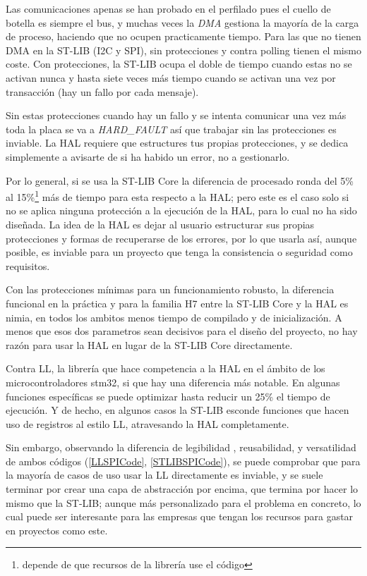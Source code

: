 \documentclass{report}
\begin{document}
\par \vspace{0.3cm}
Las comunicaciones apenas se han probado en el perfilado pues el cuello de botella es siempre el bus, y muchas veces la \textit{DMA} gestiona la mayoría de la carga de proceso, haciendo que no ocupen practicamente tiempo. Para las que no tienen DMA en la ST-LIB (I2C y SPI), sin protecciones y contra polling tienen el mismo coste. Con protecciones, la ST-LIB ocupa el doble de tiempo cuando estas no se activan nunca y hasta siete veces más tiempo cuando se activan una vez por transacción (hay un fallo por cada mensaje). \par 
Sin estas protecciones cuando hay un fallo y se intenta comunicar una vez más toda la placa se va a \textit{HARD\_FAULT} así que trabajar sin las protecciones es inviable. La HAL requiere que estructures tus propias protecciones, y se dedica simplemente a avisarte de si ha habido un error, no a gestionarlo. 
\par \vspace{0.3cm}
Por lo general, si se usa la ST-LIB Core la diferencia de procesado ronda del 5\% al 15\%\footnote{depende de que recursos de la librería use el código} más de tiempo para esta respecto a la HAL; pero este es el caso solo si no se aplica ninguna protección a la ejecución de la HAL, para lo cual no ha sido diseñada. La idea de la HAL es dejar al usuario estructurar sus propias protecciones y formas de recuperarse de los errores, por lo que usarla así, aunque posible, es inviable para un proyecto que tenga la consistencia o seguridad como requisitos. 
\par 
Con las protecciones mínimas para un funcionamiento robusto, la diferencia funcional en la práctica y para la familia H7 entre la ST-LIB Core y la HAL es nimia, en todos los ambitos menos tiempo de compilado y de inicialización. A menos que esos dos parametros sean decisivos para el diseño del proyecto, no hay razón para usar la HAL en lugar de la ST-LIB Core directamente. 
\par \vspace{0.3cm}
Contra LL, la librería que hace competencia a la HAL en el ámbito de los microcontroladores stm32, si que hay una diferencia más notable. En algunas funciones específicas se puede optimizar hasta reducir un 25\% el tiempo de ejecución. Y de hecho, en algunos casos la ST-LIB esconde funciones que hacen uso de registros al estilo LL, atravesando la HAL completamente. 
\par
Sin embargo, observando la diferencia de legibilidad , reusabilidad, y versatilidad de ambos códigos (\ref{LLSPICode}, \ref{STLIBSPICode}), se puede comprobar que para la mayoría de casos de uso usar la LL directamente es inviable, y se suele terminar por crear una capa de abstracción por encima, que termina por hacer lo mismo que la ST-LIB; aunque más personalizado para el problema en concreto, lo cual puede ser interesante para las empresas que tengan los recursos para gastar en proyectos como este.
\end{document}
